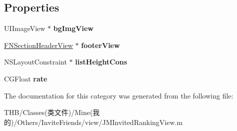 \subsection*{Properties}
\begin{DoxyCompactItemize}
\item 
\mbox{\label{category_j_m_invited_ranking_view_07_08_aa09a8a2e8a553a9c0d31fe674c7d268f}} 
U\+I\+Image\+View $\ast$ {\bfseries bg\+Img\+View}
\item 
\mbox{\label{category_j_m_invited_ranking_view_07_08_a0147ca809eaa0981afdcd747f1d6ab1c}} 
\mbox{\hyperlink{interface_f_n_section_header_view}{F\+N\+Section\+Header\+View}} $\ast$ {\bfseries footer\+View}
\item 
\mbox{\label{category_j_m_invited_ranking_view_07_08_a7c7d85d7866b534808cd36df94e7e254}} 
N\+S\+Layout\+Constraint $\ast$ {\bfseries list\+Height\+Cons}
\item 
\mbox{\label{category_j_m_invited_ranking_view_07_08_aa7b6f06cd8cbd53bc4c855ec1b8e3cb9}} 
C\+G\+Float {\bfseries rate}
\end{DoxyCompactItemize}


The documentation for this category was generated from the following file\+:\begin{DoxyCompactItemize}
\item 
T\+H\+B/\+Classes(类文件)/\+Mine(我的)/\+Others/\+Invite\+Friends/view/J\+M\+Invited\+Ranking\+View.\+m\end{DoxyCompactItemize}
